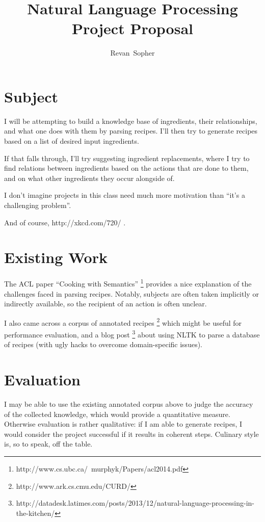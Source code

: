 \documentclass[11pt, letterpaper]{article}
\author{Revan~Sopher}
\title{Natural Language Processing Project Proposal}
\begin{document}
\maketitle

\section{Subject}
I will be attempting to build a knowledge base of ingredients, their relationships, and what one does with them by parsing recipes.
I'll then try to generate recipes based on a list of desired input ingredients.

If that falls through, I'll try suggesting ingredient replacements, where I try to find relations between ingredients based on the actions that are done to them, and on what other ingredients they occur alongside of.

I don't imagine projects in this class need much more motivation than ``it's a challenging problem''.

And of course, http://xkcd.com/720/ .

\section{Existing Work}
The ACL paper ``Cooking with Semantics'' \footnote{http://www.cs.ubc.ca/~murphyk/Papers/acl2014.pdf} provides a nice explanation of the challenges faced in parsing recipes.
Notably, subjects are often taken implicitly or indirectly available, so the recipient of an action is often unclear.

I also came across a corpus of annotated recipes \footnote{http://www.ark.cs.cmu.edu/CURD/} which might be useful for performance evaluation, and a blog post \footnote{http://datadesk.latimes.com/posts/2013/12/natural-language-processing-in-the-kitchen/} about using NLTK to parse a database of recipes (with ugly hacks to overcome domain-specific issues).

\section{Evaluation}
I may be able to use the existing annotated corpus above to judge the accuracy of the collected knowledge, which would provide a quantitative measure.
Otherwise evaluation is rather qualitative: if I am able to generate recipes, I would consider the project successful if it results in coherent steps. Culinary style is, so to speak, off the table.
\end{document}
